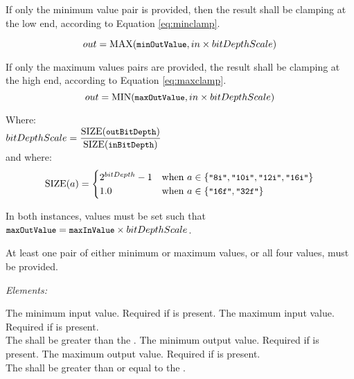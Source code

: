 If only the minimum value pair is provided, then the result shall be clamping at the low end, according to Equation \ref{eq:minclamp}.

	\begin{equation}\label{eq:minclamp}
		out = \mathrm{MAX}( {\small \texttt{minOutValue}}, in \times bitDepthScale)   
	\end{equation}

If only the maximum values pairs are provided, the result shall be clamping at the high end, according to Equation \ref{eq:maxclamp}.
	\begin{equation}\label{eq:maxclamp}
	    out = \mathrm{MIN}( {\small \texttt{maxOutValue}}, in \times bitDepthScale)
	\end{equation}				

\tabto{0.25in} Where: \\[10pt]
\tabto{0.5in} $bitDepthScale = \dfrac{\mathrm{SIZE}({\small \texttt{outBitDepth}})}{\mathrm{SIZE}({\small \texttt{inBitDepth}})}$\\[14pt] 
\tabto{0.75in}and where: \\[10pt]
\tabto{1.0in} 
\begin{equation*}
\mathrm{SIZE}(a) =
\begin{cases}
    2^{bitDepth}-1 & \text{when }a \in \{{\small \texttt{"8i"}},{\small \texttt{"10i"}},{\small \texttt{"12i"}},{\small \texttt{"16i"}}\} \\
    1.0 & \text{when }a \in \{{\small \texttt{"16f"}},{\small \texttt{"32f"}}\}
\end{cases}
\end{equation*}

In both instances, values must be set such that ${\small \texttt{maxOutValue}} = {\small \texttt{maxInValue}} \times bitDepthScale$.


At least one pair of either minimum or maximum values, or all four values, must be provided.

\emph{Elements:}
\begin{xmlfields}
	\xmlitem[minInValue][optional] The minimum input value. Required if  is present.
	\xmlitem[maxInValue][optional] The maximum input value. Required if  is present. \\
	The  shall be greater than the .
	\xmlitem[minOutValue][optional] The minimum output value. Required if  is present.
	\xmlitem[maxOutValue][optional] The maximum output value. Required if  is present. \\
	The  shall be greater than or equal to the .
\end{xmlfields}

